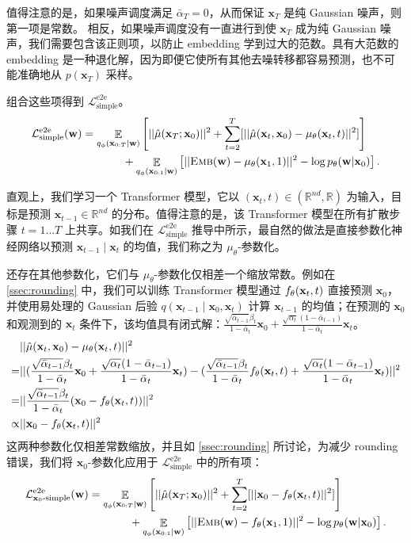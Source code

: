 \documentclass{article}
\newcommand{\exper}[1]{\textsc{#1}}
\newcommand{\expmb}[1]{\mathbf{#1}}
\newcommand{\alphabar}{\bar{\alpha}}
\newcommand{\ww}{\expmb{w}}
\newcommand{\cx}[1]{\mathbf{x}_{#1}}
\newcommand{\ptheta}{p_\theta}
\newcommand{\qphi}{q_\phi}
\newcommand{\Lsimpleee}{\mathcal{L}^\text{e2e}_\text{simple}}
\newcommand{\Emb}{\exper{Emb}}
\begin{document}
值得注意的是，如果噪声调度满足 $\alphabar_T = 0$，从而保证 $\cx{T}$ 是纯 Gaussian 噪声，则第一项是常数。
相反，如果噪声调度没有一直进行到使 $\cx{T}$ 成为纯 Gaussian 噪声，我们需要包含该正则项，以防止 embedding 学到过大的范数。具有大范数的 embedding 是一种退化解，因为即便它使所有其他去噪转移都容易预测，也不可能准确地从 $p(\cx{T})$ 采样。

组合这些项得到 $\Lsimpleee$。
\begin{align*}
    \mathcal{L}^\text{e2e}_\text{simple} (\ww) & =  \mathop{\mathbb{E}}_{\qphi(\cx{0:T} | \ww)}  \left[||\hat{\mu}(\cx{T}; \cx{0})||^2 + \sum_{t=2}^T [||\hat{\mu}(\cx{t}, \cx{0})-\mu_\theta(\cx{t}, t) ||^2] \right] \\
& ~~~~~~~~~~~ + \mathop{\mathbb{E}}_{\qphi(\cx{0:1} | \ww)} \left[|| \Emb(\ww) - \mu_\theta(\cx{1}, 1) ||^2  - \log \ptheta(\ww | \cx{0})\right].
\end{align*}

直观上，我们学习一个 Transformer 模型，它以 $(\cx{t}, t) \in (\mathbb{R}^{nd}, \mathbb{R})$ 为输入，目标是预测 $\cx{t-1} \in \mathbb{R}^{nd}$ 的分布。值得注意的是，该 Transformer 模型在所有扩散步骤 $t = 1\dots T$ 上共享。如我们在 $\Lsimpleee$ 推导中所示，最自然的做法是直接参数化神经网络以预测 $\cx{t-1} \mid \cx{t}$ 的均值，我们称之为 $\mu_\theta$-参数化。

还存在其他参数化，它们与 $\mu_\theta$-参数化仅相差一个缩放常数。例如在 \cref{ssec:rounding} 中，我们可以训练 Transformer 模型通过 $\xxtheta(\cx{t}, t)$ 直接预测 $\cx{0}$，并使用易处理的 Gaussian 后验 $q(\cx{t-1} \mid \cx{0}, \cx{t})$ 计算 $\cx{t-1}$ 的均值；在预测的 $\cx{0}$ 和观测到的 $\cx{t}$ 条件下，该均值具有闭式解：$ \frac{\sqrt{\alphabar_{t-1}} \beta_t}{1-\alphabar_t}\cx{0} + \frac{\sqrt{\alpha_t} (1-\alphabar_{t-1})}{1-\alphabar_t} \cx{t}$。
\begin{align*}
& ||\hat{\mu}(\cx{t}, \cx{0})-\mu_\theta(\cx{t}, t) ||^2 \\
= &  ||(\frac{\sqrt{\alphabar_{t-1}} \beta_t}{1-\alphabar_t}\cx{0} + \frac{\sqrt{\alpha_t} (1-\alphabar_{t-1})}{1-\alphabar_t} \cx{t}) - (\frac{\sqrt{\alphabar_{t-1}} \beta_t}{1-\alphabar_t}\xxtheta(\cx{t}, t) + \frac{\sqrt{\alpha_t} (1-\alphabar_{t-1})}{1-\alphabar_t} \cx{t})||^2\\
= & ||\frac{\sqrt{\alphabar_{t-1}} \beta_t}{1-\alphabar_t}(\cx{0} - \xxtheta(\cx{t}, t))||^2\\
\propto &  ||\cx{0} - \xxtheta(\cx{t}, t)||^2
\end{align*}
这两种参数化仅相差常数缩放，并且如 \cref{ssec:rounding} 所讨论，为减少 rounding 错误，我们将 $\cx{0}$-参数化应用于 $\Lsimpleee$ 中的所有项：
\begin{align*}
    \mathcal{L}^\text{e2e}_{\cx{0}\text{-simple}} (\ww) & =  \mathop{\mathbb{E}}_{\qphi(\cx{0:T} | \ww)}  \left[||\hat{\mu}(\cx{T}; \cx{0})||^2 + \sum_{t=2}^T [||\cx{0}-\xxtheta(\cx{t}, t) ||^2] \right] \\
& ~~~~~~~~~~~ + \mathop{\mathbb{E}}_{\qphi(\cx{0:1} | \ww)} \left[|| \Emb(\ww) - \xxtheta(\cx{1}, 1) ||^2  - \log \ptheta(\ww | \cx{0})\right].
\end{align*}
\end{document}
